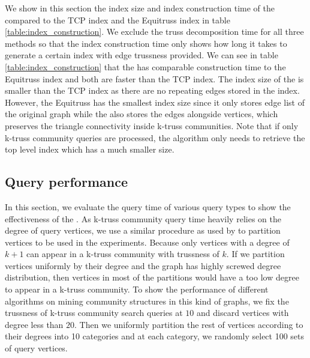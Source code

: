 We show in this section the index size and index construction time of the \twolevelindex{} compared to the TCP index and the Equitruss index in 
table \ref{table:index_construction}. 
We exclude the truss decomposition time for all three methods so that the index construction time only shows how long it takes to generate a certain index with edge trussness provided. 
We can see in table \ref{table:index_construction} that the \twolevelindex{} has comparable construction time to the Equitruss index and both are faster than the TCP index. The index size of the \twolevelindex{} is smaller than the TCP index as there are no repeating edges stored in the index. However, the Equitruss has the smallest index size since it only stores edge list of the original graph while the \twolevelindex{} also stores the edges alongside vertices, which preserves the triangle connectivity inside k-truss communities. Note that if only \toplevelprob{} k-truss community queries are processed, the algorithm only needs to retrieve the top level index which has a much smaller size. %

\subsection{Query performance}
\label{eval_query_time}

In this section, we evaluate the query time of various query types to show the effectiveness of the \twolevelindex{}. As k-truss community query time heavily relies on the degree of query vertices, we use a similar procedure as used by \cite{huang2014querying} to partition vertices to be used in the experiments. Because only vertices with a degree of $k + 1$ can appear in a k-truss community with trussness of $k$. If we partition vertices uniformly by their degree and the graph has highly screwed degree distribution, then vertices in most of the partitions would have a too low degree to appear in a k-truss community. To show the performance of different algorithms on mining community structures in this kind of graphs, we fix the trussness of k-truss community search queries at $10$ and discard vertices with degree less than $20$. Then we uniformly partition the rest of vertices according to their degrees into 10 categories and at each category, we randomly select 100 sets of query vertices.

